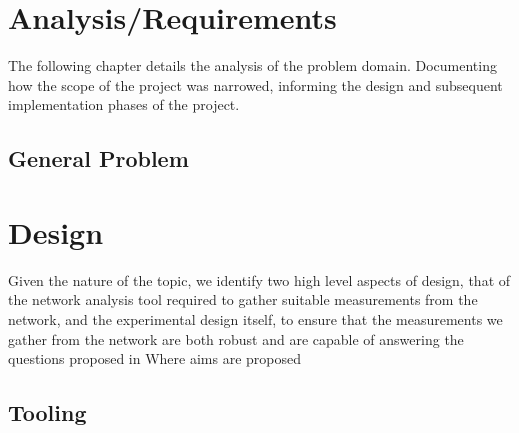 \documentclass{l4proj}
\begin{document}





\chapter{Analysis/Requirements}

The following chapter details the analysis of the problem domain. Documenting how the scope of the project was narrowed, informing the design and subsequent implementation phases of the project.

\section{General Problem}









\chapter{Design}
\label{chap:design}

Given the nature of the topic, we identify two high level aspects of design, that of the network analysis tool required to gather suitable measurements from the network, and the experimental design itself, to ensure that the measurements we gather from the network are both robust and are capable of answering the questions proposed in {{Where aims are proposed}}

\section{Tooling}
\end{document}
